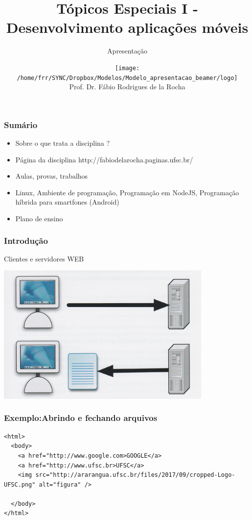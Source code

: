 \documentclass[14pt]{beamer}
\title[]{\huge Tópicos Especiais I - Desenvolvimento aplicações móveis}
\subtitle{Apresentação}
\institute[Apresentação]{}
\author[]{\texttt{[image: /home/frr/SYNC/Dropbox/Modelos/Modelo\_apresentacao\_beamer/logo]}\\Prof. Dr. Fábio Rodrigues de la Rocha}
\date[]{}
\begin{document}
\frame{\titlepage}



\begin{frame}\frametitle{Sumário}
\begin{itemize}
\item Sobre o que trata a disciplina ?
\pause
\item Página da disciplina http://fabiodelarocha.paginas.ufsc.br/
\pause
\item Aulas, provas, trabalhos
\pause 
\item Linux, Ambiente de programação, Programação em NodeJS, Programação híbrida para smartfones (Android)
\pause
\item Plano de ensino

\end{itemize}
\end{frame}


\begin{frame}\frametitle{Introdução}

\begin{block}{Clientes e servidores WEB}

\includegraphics[width=0.8\textwidth]{clienteServidor}

\end{block}

\end{frame}

\begin{frame}[fragile]
 \frametitle{Exemplo:Abrindo e fechando arquivos}
\begin{lstlisting}[basicstyle=\tiny\ttfamily]
<html>
  <body>
    <a href="http://www.google.com>GOOGLE</a>
    <a href="http://www.ufsc.br>UFSC</a>
    <img src="http://ararangua.ufsc.br/files/2017/09/cropped-Logo-UFSC.png" alt="figura" />
  
  </body>
</html>
\end{lstlisting}

\end{frame}
\end{document}
